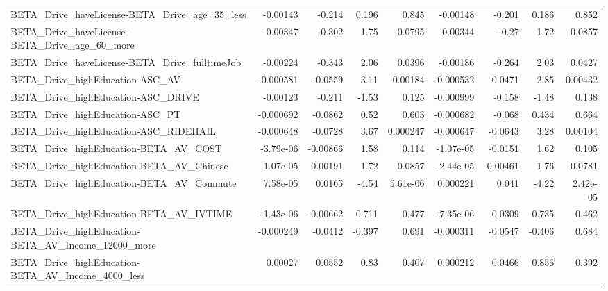 \begin{tabular}{lrrrrrrrr}
BETA\_Drive\_haveLicense-BETA\_Drive\_age\_35\_less      &    -0.00143 &       -0.214 &     0.196 &    0.845 &   -0.00148 &      -0.201 &        0.186 &         0.852 \\
BETA\_Drive\_haveLicense-BETA\_Drive\_age\_60\_more      &    -0.00347 &       -0.302 &      1.75 &   0.0795 &   -0.00344 &       -0.27 &         1.72 &        0.0857 \\
BETA\_Drive\_haveLicense-BETA\_Drive\_fulltimeJob      &    -0.00224 &       -0.343 &      2.06 &   0.0396 &   -0.00186 &      -0.264 &         2.03 &        0.0427 \\
BETA\_Drive\_highEducation-ASC\_AV                    &   -0.000581 &      -0.0559 &      3.11 &  0.00184 &  -0.000532 &     -0.0471 &         2.85 &       0.00432 \\
BETA\_Drive\_highEducation-ASC\_DRIVE                 &    -0.00123 &       -0.211 &     -1.53 &    0.125 &  -0.000999 &      -0.158 &        -1.48 &         0.138 \\
BETA\_Drive\_highEducation-ASC\_PT                    &   -0.000692 &      -0.0862 &      0.52 &    0.603 &  -0.000682 &      -0.068 &        0.434 &         0.664 \\
BETA\_Drive\_highEducation-ASC\_RIDEHAIL              &   -0.000648 &      -0.0728 &      3.67 & 0.000247 &  -0.000647 &     -0.0643 &         3.28 &       0.00104 \\
BETA\_Drive\_highEducation-BETA\_AV\_COST              &   -3.79e-06 &     -0.00866 &      1.58 &    0.114 &  -1.07e-05 &     -0.0151 &         1.62 &         0.105 \\
BETA\_Drive\_highEducation-BETA\_AV\_Chinese           &    1.07e-05 &      0.00191 &      1.72 &   0.0857 &  -2.44e-05 &    -0.00461 &         1.76 &        0.0781 \\
BETA\_Drive\_highEducation-BETA\_AV\_Commute           &    7.58e-05 &       0.0165 &     -4.54 & 5.61e-06 &   0.000221 &       0.041 &        -4.22 &      2.42e-05 \\
BETA\_Drive\_highEducation-BETA\_AV\_IVTIME            &   -1.43e-06 &     -0.00662 &     0.711 &    0.477 &  -7.35e-06 &     -0.0309 &        0.735 &         0.462 \\
BETA\_Drive\_highEducation-BETA\_AV\_Income\_12000\_more &   -0.000249 &      -0.0412 &    -0.397 &    0.691 &  -0.000311 &     -0.0547 &       -0.406 &         0.684 \\
BETA\_Drive\_highEducation-BETA\_AV\_Income\_4000\_less  &     0.00027 &       0.0552 &      0.83 &    0.407 &   0.000212 &      0.0466 &        0.856 &         0.392 \\

\end{tabular}
